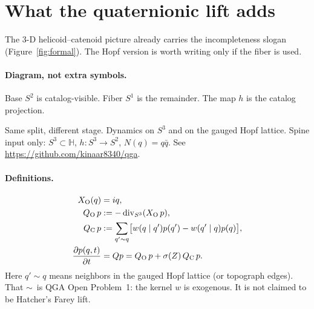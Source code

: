 \section{What the quaternionic lift adds}

The \(3\)-D helicoid--catenoid picture already carries the incompleteness
slogan (Figure~\ref{fig:formal}).
The Hopf version is worth writing only if the fiber is used.

\paragraph{Diagram, not extra symbols.}
Base \(S^{2}\) is catalog-visible.
Fiber \(S^{1}\) is the remainder.
The map \(h\) is the catalog projection.

\begin{center}
\end{center}

\begin{model}
Same split, different stage.
Dynamics on \(S^{3}\) and on the gauged Hopf lattice.
Spine input only:
\(S^{3}\subset\mathbb{H}\),
\(h:S^{3}\to S^{2}\),
\(N(q)=q\bar q\).
See \url{https://github.com/kinaar8340/qga}.
\end{model}

\paragraph{Definitions.}
\begin{align}
X_{\mathrm{O}}(q)
&= iq,
\label{eq:qga-XO}\\
Q_{\mathrm{O}}\,p
&:= -\operatorname{div}_{S^{3}}(X_{\mathrm{O}}\,p),
\label{eq:qga-QO}\\
Q_{\mathrm{C}}\,p
&:= \sum_{q'\sim q}
      \bigl[w(q\mid q')p(q')-w(q'\mid q)p(q)\bigr],
\label{eq:qga-QC}\\
\frac{\partial p(q,t)}{\partial t}
&= Qp
= Q_{\mathrm{O}}\,p + \sigma(Z)\,Q_{\mathrm{C}}\,p.
\label{eq:qga-master}
\end{align}
Here \(q'\sim q\) means neighbors in the gauged Hopf lattice
(or topograph edges).
That \(\sim\)\, is QGA Open Problem~1:
the kernel \(w\) is exogenous.
It is not claimed to be Hatcher's Farey lift.

